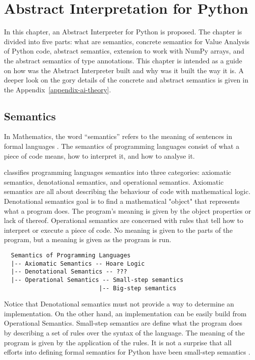 \chapter{Abstract Interpretation for Python}\label{ai-for-python}

In this chapter, an Abstract Interpreter for Python is proposed. The chapter is divided
into five parts: what are semantics, concrete semantics for Value Analysis of Python code,
abstract semantics, extension to work with NumPy arrays, and the abstract semantics of
type annotations. This chapter is intended as a guide on how was the Abstract Interpreter
built and why was it built the way it is. A deeper look on the gory details of the
concrete and abstract semantics is given in the Appendix~\ref{appendix-ai-theory}.

\section{Semantics}

In Mathematics, the word \enquote{semantics} refers to the meaning of sentences in formal
languages \autocite{gunter_semantics_1992}. The semantics of programming languages
consist of what a piece of code means, how to interpret it, and how to analyse it.

\textcite{mitchell1996foundations} classifies programming
languages semantics into three categories: axiomatic semantics, denotational semantics,
and operational semantics. Axiomatic semantics are all about describing the behaviour of
code with mathematical logic. Denotational semantics goal is to find a mathematical
"object" that represents what a program does. The program's meaning is given by the
object properties or lack of thereof. Operational semantics are concerned with rules that
tell how to interpret or execute a piece of code. No meaning is given to the parts of the
program, but a meaning is given as the program is run.


\begin{verbatim}
  Semantics of Programming Languages
  |-- Axiomatic Semantics -- Hoare Logic
  |-- Denotational Semantics -- ???
  |-- Operational Semantics -- Small-step semantics
                           |-- Big-step semantics
\end{verbatim}

Notice that Denotational semantics must not provide a way to determine an implementation.
On the other hand, an implementation can be easily build from Operational Semantics.
Small-step semantics are define what the program does by describing a set of rules over
the syntax of the language. The meaning of the program is given by the application of the
rules. It is not a surprise that all efforts into defining formal semantics for Python
have been small-step semantics
\autocites{ranson_semantics_2008}{guth_formal_2013}{politz_python_2013}{fromherz_static_2018}.


